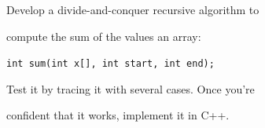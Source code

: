 Develop a divide-and-conquer recursive algorithm to

compute the sum of the values an array:



\verb!int sum(int x[], int start, int end);!



Test it by tracing it with several cases. Once you're

confident that it works, implement it in C++.


